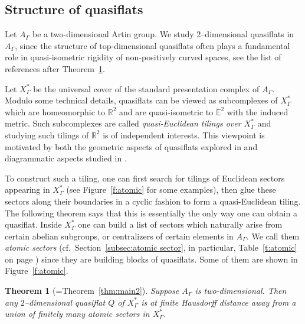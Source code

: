 \documentclass[11pt]{amsart}
\newtheorem{theorem}{Theorem}[section]
\theoremstyle{definition}
\newcommand{\Xa}{X^{\ast}}
\begin{document}
\subsection*{Structure of quasiflats}
Let $A_\Gamma$ be a two-dimensional Artin group. We study $2$--dimensional quasiflats in $A_\Gamma$, since the structure of top-dimensional quasiflats often plays a fundamental role in quasi-isometric rigidity of non-posi\-ti\-ve\-ly curved spaces, see the list of references after Theorem~\ref{thm:intro1}.


Let $\Xa_\Gamma$ be the universal cover of the standard presentation complex of $A_\Gamma$. Modulo some technical details, quasiflats can be viewed as subcomplexes of $\Xa_\Gamma$ which are homeomorphic to $\mathbb R^2$ and are quasi-isometric to $\mathbb E^2$ with the induced metric. Such subcomplexes are called \emph{quasi-Euclidean tilings over $\Xa_\Gamma$} and studying such tilings of $\mathbb R^2$ is of independent interests. This viewpoint is motivated by both the geometric aspects of quasiflats explored in \cite{bks} and diagrammatic aspects studied in \cite{AppelSchupp1983,Pride,olshanskii2017flat}.

To construct such a tiling, one can first search for tilings of Euclidean sectors appearing in $\Xa_\Gamma$ (see Figure~\ref{f:atomic} for some examples), then glue these sectors along their boundaries in a cyclic fashion to form a quasi-Euclidean tiling. The following theorem says that this is essentially the only way one can obtain a quasiflat. Inside $\Xa_\Gamma$ one can build a list of sectors which naturally arise from certain abelian subgroups, or centralizers of certain elements in $A_\Gamma$. We call them \emph{atomic sectors} (cf.\ Section~\ref{subsec:atomic sector}, in particular, Table~\ref{t:atomic} on page \pageref{t:atomic}) since they are building blocks of quasiflats. Some of them are shown in Figure~\ref{f:atomic}.
\begin{theorem}[=Theorem~\ref{thm:main2}]
	\label{thm:intro1}
Suppose $A_\Gamma$ is two-dimensional. Then any $2$--dimensional quasiflat $Q$ of $\Xa_\Gamma$ is at finite Hausdorff distance away from a union of finitely many atomic sectors in $\Xa_\Gamma$.
\end{theorem}
\end{document}
